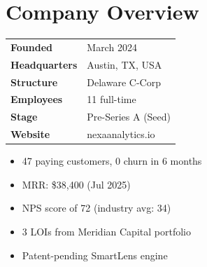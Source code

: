 \section{\sectionicon{\faBuilding}Company Overview}

\noindent
\begin{minipage}[t]{0.48\linewidth}
  \begin{tcolorbox}[nexacard, title={\faInfo\enspace Company Facts}]
    \small
    \begin{tabular}{@{}ll@{}}
      \textbf{Founded}      & March 2024 \\[3pt]
      \textbf{Headquarters} & Austin, TX, USA \\[3pt]
      \textbf{Structure}    & Delaware C-Corp \\[3pt]
      \textbf{Employees}    & 11 full-time \\[3pt]
      \textbf{Stage}        & Pre-Series A (Seed) \\[3pt]
      \textbf{Website}      & nexaanalytics.io \\[3pt]
    \end{tabular}
  \end{tcolorbox}
\end{minipage}\hfill
\begin{minipage}[t]{0.48\linewidth}
  \begin{tcolorbox}[nexacard, title={\faTrophy\enspace Traction Highlights}]
    \small
    \begin{itemize}[leftmargin=14pt, itemsep=3pt]
      \item[\textcolor{NexaTeal}{\faCheckCircle}] 47 paying customers, 0 churn in 6 months
      \item[\textcolor{NexaTeal}{\faCheckCircle}] MRR: \$38,400 (Jul 2025)
      \item[\textcolor{NexaTeal}{\faCheckCircle}] NPS score of 72 (industry avg: 34)
      \item[\textcolor{NexaTeal}{\faCheckCircle}] 3 LOIs from Meridian Capital portfolio
      \item[\textcolor{NexaTeal}{\faCheckCircle}] Patent-pending SmartLens engine
    \end{itemize}
  \end{tcolorbox}
\end{minipage}

\par

